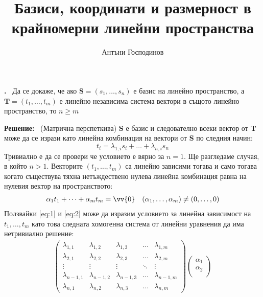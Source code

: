 \documentclass[a4paper,12pt,fleqn]{article}
\title{Базиси, координати и размерност в крайномерни линейни пространства}
\author{Антъни Господинов}
\date{}
\newcounter{problem}
\newcommand\problem{%
  \stepcounter{problem}%
  \textbf{\theproblem.}~%
}
\newcommand\solution{%
  \textbf{Решение:}~%
}
\begin{document}
\maketitle

    \problem{
      Да се докаже, че ако \( \textbf{S}=\left( s_{1},\dots,s_{n} \right) \) е базис на линейно пространство, а \( \textbf{T}=\left( t_{1},\dots,t_{m} \right) \) е линейно независима система вектори в същото линейно пространство, то \( n \geq m \)
    }

    \solution{(Матрична перспеткива)
      \textbf{S} е базис и следователно всеки вектор от \textbf{T} може да се изрази като линейна комбинация на вектори от \textbf{S} по следния начин:
      \begin{equation} \label{eq:1}
        t_{i}=\lambda_{1,i} s_{i} + \dots + \lambda_{n,i} s_{n}
      \end{equation}
      Тривиално е да се провери че условието е вярно за \( n=1 \).
      Ще разгледаме случая, в който \( n > 1 \). Векторите \( (t_{1},\dots,t_{m}) \) са линейно зависими тогава и само тогава когато съществува тяхна нетъждествено нулева линейна комбинация равна на нулевия вектор на пространството:
      \begin{align} \label{eq:2}
        \alpha_{1}t_{1}+\dots+\alpha_{m}t_{m}=\vv{0} && \left( \alpha_{1},\dots,\alpha_{m} \right) \neq \left( 0,\dots,0 \right)
      \end{align} 
      Ползвайки \eqref{eq:1} и \eqref{eq:2} може да изразим условието за линейна зависимост на \( t_{1},\dots,t_{m} \) като това следната хомогенна система от линейни уравнения да има нетривиално решение:
      \begin{gather}\label{eq:3}
        \begin{pmatrix}
          \lambda_{1, 1} & \lambda_{1, 2} & \lambda_{1, 3} & \dots & \lambda_{1, m} \\
          \lambda_{2, 1} & \lambda_{2, 2} & \lambda_{2, 3} & \dots & \lambda_{2, m} \\
          \vdots & \vdots & \vdots & \ddots & \vdots \\
          \lambda_{n-1, 1} & \lambda_{n-1, 2} & \lambda_{n-1, 3} & \dots & \lambda_{n-1, m}  \\
          \lambda_{n, 1} & \lambda_{n, 2} & \lambda_{n, 3} & \dots & \lambda_{n, m} 
        \end{pmatrix}
        \begin{pmatrix}
          \alpha_{1} \\
          \alpha_{2} \\

\end{pmatrix}
\end{gather}}
\end{document}
